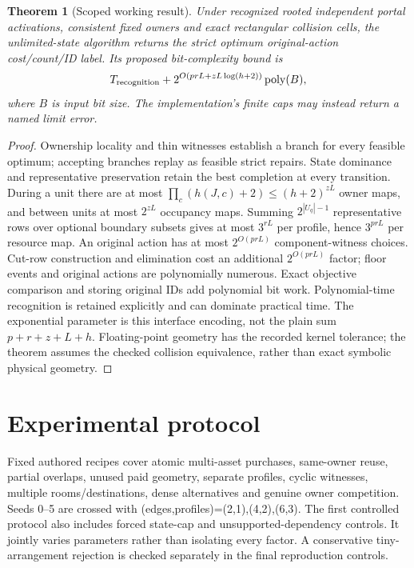 \documentclass[10pt]{article}
\newtheorem{theorem}{Theorem}
\begin{document}
\begin{theorem}[Scoped working result]
Under recognized rooted independent portal activations, consistent fixed owners and exact rectangular collision cells, the unlimited-state algorithm returns the strict optimum original-action cost/count/ID label. Its proposed bit-complexity bound is
\[
T_{\rm recognition}+2^{O(prL+zL\log(h+2))}\operatorname{poly}(B),
\]
where $B$ is input bit size. The implementation's finite caps may instead return a named limit error.
\end{theorem}
\begin{proof}
Ownership locality and thin witnesses establish a branch for every feasible optimum; accepting branches replay as feasible strict repairs. State dominance and representative preservation retain the best completion at every transition. During a unit there are at most $\prod_c(h(J,c)+2)\le(h+2)^{zL}$ owner maps, and between units at most $2^{zL}$ occupancy maps. Summing $2^{|U_q|-1}$ representative rows over optional boundary subsets gives at most $3^{rL}$ per profile, hence $3^{prL}$ per resource map. An original action has at most $2^{O(prL)}$ component-witness choices. Cut-row construction and elimination cost an additional $2^{O(prL)}$ factor; floor events and original actions are polynomially numerous. Exact objective comparison and storing original IDs add polynomial bit work. Polynomial-time recognition is retained explicitly and can dominate practical time. The exponential parameter is this interface encoding, not the plain sum $p+r+z+L+h$. Floating-point geometry has the recorded kernel tolerance; the theorem assumes the checked collision equivalence, rather than exact symbolic physical geometry.
\end{proof}

\section{Experimental protocol}
Fixed authored recipes cover atomic multi-asset purchases, same-owner reuse, partial overlaps, unused paid geometry, separate profiles, cyclic witnesses, multiple rooms/destinations, dense alternatives and genuine owner competition. Seeds 0--5 are crossed with (edges,profiles)=(2,1),(4,2),(6,3). The first controlled protocol also includes forced state-cap and unsupported-dependency controls. It jointly varies parameters rather than isolating every factor. A conservative tiny-arrangement rejection is checked separately in the final reproduction controls.
\end{document}
